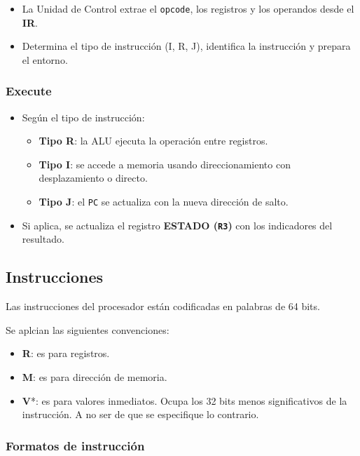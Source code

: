 \documentclass{article}
\begin{document}
\begin{itemize}
  \item La Unidad de Control extrae el \texttt{opcode}, los registros y los operandos desde el \textbf{IR}.
  \item Determina el tipo de instrucción (I, R, J), identifica la instrucción y prepara el entorno.
\end{itemize}

\subsubsection{Execute}

\begin{itemize}
  \item Según el tipo de instrucción:
        \begin{itemize}
          \item \textbf{Tipo R}: la ALU ejecuta la operación entre registros.
          \item \textbf{Tipo I}: se accede a memoria usando direccionamiento con desplazamiento o directo.
          \item \textbf{Tipo J}: el \texttt{PC} se actualiza con la nueva dirección de salto.
        \end{itemize}
  \item Si aplica, se actualiza el registro \textbf{ESTADO (\texttt{R3})} con los indicadores del resultado.
\end{itemize}



\subsection{Instrucciones}

Las instrucciones del procesador están codificadas
en palabras de 64 bits.

Se aplcian las siguientes convenciones:
\begin{itemize}
  \item \textbf{R}: es para registros.
  \item \textbf{M}: es para dirección de memoria.
  \item \textbf{V}*: es para valores inmediatos.
        Ocupa los 32 bits menos significativos de la instrucción.
        A no ser
        de que se especifique lo contrario.
\end{itemize}

\subsubsection{Formatos de instrucción}
\end{document}
